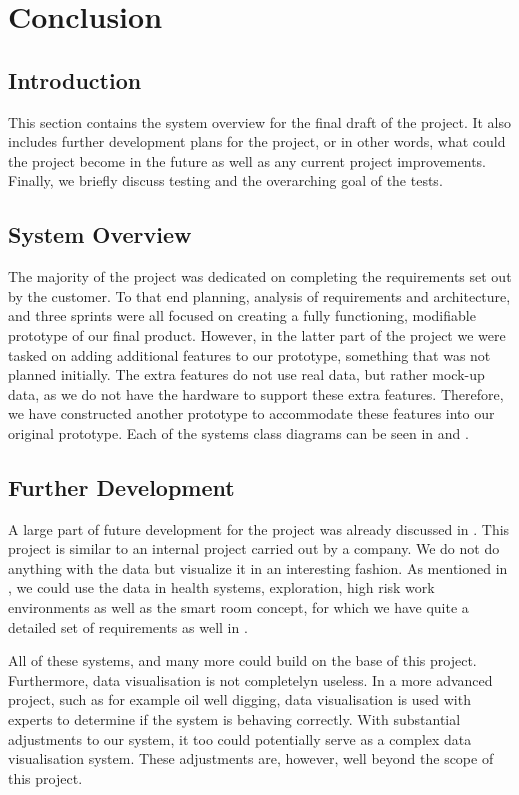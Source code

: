 \documentclass[../document]{subfiles}
\begin{document}
\section{Conclusion}

\subsection{Introduction}
This section contains the system overview for the final draft of the project. It also includes further development plans for the project, or in other words, what could the project become in the future as well as any current project improvements. Finally, we briefly discuss testing and the overarching goal of the tests.

\subsection{System Overview}
The majority of the project was dedicated on completing the requirements set out by the customer. To that end planning, analysis of requirements and architecture, and three sprints were all focused on creating a fully functioning, modifiable prototype of our final product. However, in the latter part of the project we were tasked on adding additional features to our prototype, something that was not planned initially. The extra features do not use real data, but rather mock-up data, as we do not have the hardware to support these extra features. Therefore, we have constructed another prototype to accommodate these features into our original prototype. Each of the systems class diagrams can be seen in  and .

\subsection{Further Development}
A large part of future development for the project was already discussed in . This project is similar to an internal project carried out by a company. We do not do anything with the data but visualize it in an interesting fashion. As mentioned in , we could use the data in health systems, exploration, high risk work environments as well as the smart room concept, for which we have quite a detailed set of requirements as well in . 

All of these systems, and many more could build on the base of this project. Furthermore, data visualisation is not completelyn useless. In a more advanced project, such as for example oil well digging, data visualisation is used with experts to determine if the system is behaving correctly. With substantial adjustments to our system, it too could potentially serve as a complex data visualisation system. These adjustments are, however, well beyond the scope of this project.
\end{document}
